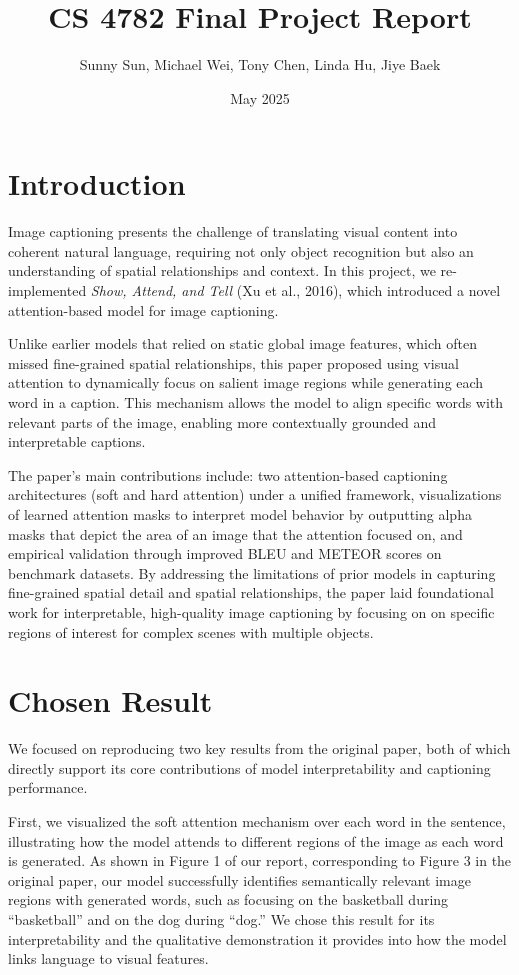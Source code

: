 \documentclass{article}
\title{CS 4782 Final Project Report}
\author{Sunny Sun, Michael Wei, Tony Chen, Linda Hu, Jiye Baek}
\date{May 2025}
\begin{document}
\maketitle

\vspace{-3em}
\section{Introduction}

Image captioning presents the challenge of translating visual content into coherent natural language, requiring not only object recognition but also an understanding of spatial relationships and context. In this project, we re-implemented \textit{Show, Attend, and Tell} (Xu et al., 2016), which introduced a novel attention-based model for image captioning.

Unlike earlier models that relied on static global image features, which often missed fine-grained spatial relationships, this paper proposed using visual attention to dynamically focus on salient image regions while generating each word in a caption. This mechanism allows the model to align specific words with relevant parts of the image, enabling more contextually grounded and interpretable captions.

The paper’s main contributions include: two attention-based captioning architectures (soft and hard attention) under a unified framework, visualizations of learned attention masks to interpret model behavior by outputting alpha masks that depict the area of an image that the attention focused on, and empirical validation through improved BLEU and METEOR scores on benchmark datasets. By addressing the limitations of prior models in capturing fine-grained spatial detail and spatial relationships, the paper laid foundational work for interpretable, high-quality image captioning by focusing on on specific regions of interest for complex scenes with multiple objects.

\section{Chosen Result}
We focused on reproducing two key results from the original paper, both of which directly support its core contributions of model interpretability and captioning performance.

First, we visualized the soft attention mechanism over each word in the sentence, illustrating how the model attends to different regions of the image as each word is generated. As shown in Figure 1 of our report, corresponding to Figure 3 in the original paper, our model successfully identifies semantically relevant image regions with generated words, such as focusing on the basketball during “basketball” and on the dog during “dog.” We chose this result for its interpretability and the qualitative demonstration it provides into how the model links language to visual features.
\end{document}

